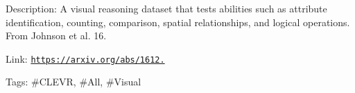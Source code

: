 Description\+: A visual reasoning dataset that tests abilities such as attribute identification, counting, comparison, spatial relationships, and logical operations. From Johnson et al. \textquotesingle{}16.

Link\+: \href{https://arxiv.org/abs/1612.06890}{\tt https\+://arxiv.\+org/abs/1612.}

Tags\+: \#\+C\+L\+E\+VR, \#\+All, \#\+Visual 